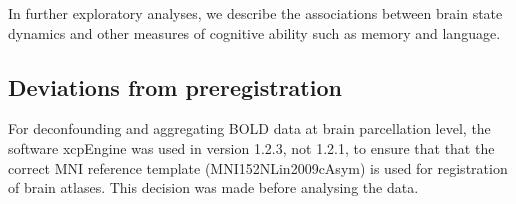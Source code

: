 In further exploratory analyses, we describe the associations between brain state dynamics and other measures of cognitive ability such as memory and language.

\subsection{Deviations from preregistration}
For deconfounding and aggregating BOLD data at brain parcellation level, the software xcpEngine was used in version 1.2.3, not 1.2.1, to ensure that that the correct MNI reference template (MNI152NLin2009cAsym) is used for registration of brain atlases. This decision was made before analysing the data.